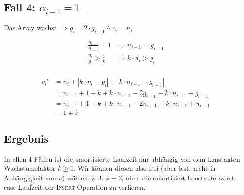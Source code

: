 \documentclass[parskip=half,a4paper]{scrartcl}
\begin{document}
\subsection*{Fall 4: $\alpha_{i-1} = 1$}

Das Array wächst
$\Rightarrow g_i = 2 \cdot g_{i-1} \land c_i = n_i$

\begin{equation}
\begin{aligned}
\frac{n_{i-1}}{g_{i-1}} = 1
 &\Rightarrow n_{i-1} = g_{i-1}\\
\frac{n_{i}}{g_{i}} > \frac{1}{k}
 &\Rightarrow k \cdot n_{i} > g_{i}\\
\end{aligned}
\end{equation}



\begin{equation}
\begin{aligned}
   c_i' &= n_i + \left|k \cdot n_i - g_i\right| - \left|k \cdot n_{i-1} - g_{i-1}\right|\\
   &= n_{i-1} + 1 + k + k \cdot n_{i-1} - 2 g_{i-1} - k \cdot n_{i-1} + g_{i-1}\\
   &= n_{i-1} + 1 + k + k \cdot n_{i-1} - 2 n_{i-1} - k \cdot n_{i-1} + n_{i-1}\\
   &= 1 + k
\end{aligned}
\end{equation}

\subsection*{Ergebnis}

In allen 4 Fällen ist die amortisierte Laufzeit nur abhängig von dem konstanten Wachstumsfaktor $k \ge 1$. Wir können diesen also frei (aber fest, nicht in Abhängigkeit von $n$) wählen, z.B. $k=3$, ohne die amortisiert konstante worst-case Laufzeit der \textsc{Insert} Operation zu verlieren.
\end{document}
